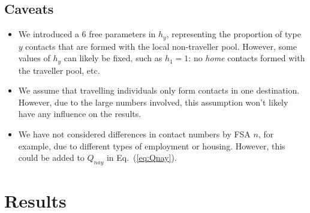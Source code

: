 \documentclass{article}
\begin{document}
  \subsection{Caveats}\label{ss:caveats}
  \begin{itemize}
    \item We introduced a 6 free parameters in $h_y$, representing
          the proportion of type $y$ contacts that are formed with the local non-traveller pool.
          However, some values of $h_y$ can likely be fixed, such as
          $h_1 = 1$: no \emph{home} contacts formed with the traveller pool, etc.
    \item We assume that travelling individuals only form contacts in one destination.
          However, due to the large numbers involved,
          this assumption won't likely have any influence on the results.
    \item We have not considered differences in contact numbers by FSA $n$,
          for example, due to different types of employment or housing.
          However, this could be added to $Q_{nay}$ in Eq.~(\ref{eq:Qnay}).
  \end{itemize}
  \section{Results}\label{s:results}
\end{document}
